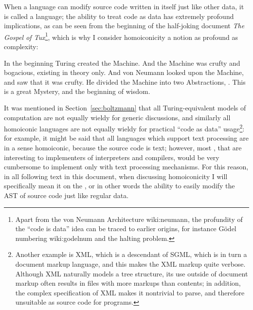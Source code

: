 When a language can modify source code written in itself just like other
data, it is called a  language;
the ability to treat code as data has extremely profound implications,
as can be seen from the beginning of the half-joking document \emph{The
Gospel of Tux}\footnote{Apart from the von Neumann Architecture\cupercite%
{wiki:neumann}, the profundity of the ``code is data'' idea can be
traced to earlier origins, for instance Gödel numbering\cupercite%
{wiki:godelnum} and the halting problem.}, which
is why I consider homoiconicity a notion as profound as complexity:
\begin{quoting}
	In the beginning Turing created the Machine.  And the Machine was crufty
	and bogacious, existing in theory only.  And von Neumann looked upon
	the Machine, and saw that it was crufty.  He divided the Machine into
	two Abstractions, .  This is a great Mystery, and the beginning of wisdom.
\end{quoting}
It was mentioned in Section~\ref{sec:boltzmann} that all Turing-equivalent
models of computation are not equally wieldy for generic discussions, and
similarly all homoiconic languages are not equally wieldy for practical ``code
as data'' usage\footnote{Another example is XML, which is a descendant of SGML,
which is in turn a document markup language, and this makes the XML markup quite
verbose.  Although XML naturally models a tree structure, its use outside of
document markup often results in files with more markups than contents; in
addition, the complex specification of XML makes it nontrivial to parse, and
therefore unsuitable as source code for programs.}: for example, it might be
said that all languages which support text processing are in a sense homoiconic,
because the source code is text; however, most ,
that are interesting to implementers of interpreters and compilers, would be
very cumbersome to implement only with text processing mechanisms.  For this
reason, in all following text in this document, when discussing homoiconicity
I will specifically mean it on the , or in other words
the ability to easily modify the AST of source code just like regular data.

